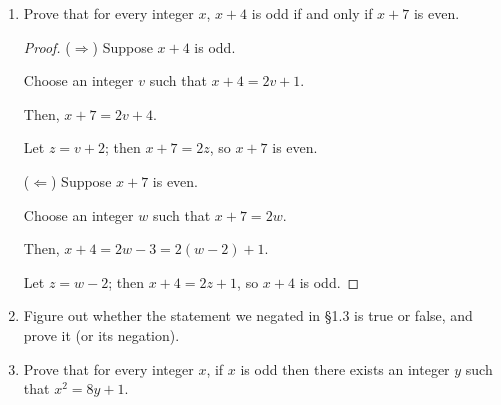 \documentclass{article}
\newcommand{\negation}[1]{\textbf{Negation:} #1}
\begin{document}
\begin{enumerate}
\begin{enumerate}
\begin{proof}
          Then, $x^3 = 8w^3+12w^2+6w+1$.

          Let $z=4w^3+6w^2+3w$; then $x^3=2z+1$, so $x^3$ is odd.
        \end{proof}

        \negation{There is an integer $x$ such that $x$ is odd and $x^3$ is even.}

    \end{enumerate}
  \item Prove that for every integer $x$, $x + 4$ is odd if and only
    if $x + 7$ is even.

    \begin{proof}
      ($\Rightarrow$) Suppose $x+4$ is odd.

      Choose an integer $v$ such that $x+4=2v+1$.

      Then, $x+7 = 2v+4$.

      Let $z=v+2$; then $x+7 = 2z$, so $x+7$ is even.

      ($\Leftarrow$) Suppose $x+7$ is even.

      Choose an integer $w$ such that $x+7=2w$.

      Then, $x+4=2w-3=2(w-2)+1$.

      Let $z=w-2$; then $x+4=2z+1$, so $x+4$ is odd.
    \end{proof}

  \item Figure out whether the statement we negated in \S1.3 is true
    or false, and prove it (or its negation).

  \item Prove that for every integer $x$, if $x$ is odd then there
    exists an integer $y$ such that $x^2 = 8y + 1$.

\end{enumerate}
\end{document}
